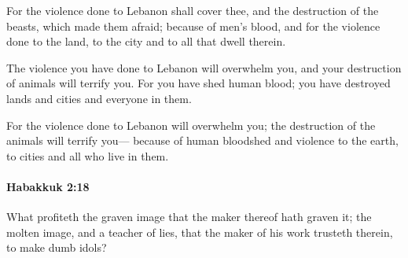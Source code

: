 			\begin{versebox}
					\item[BHS] 
					\item[LXX] 
					\item[ASV] For the violence done to Lebanon shall cover thee, and the destruction of the beasts, which made them afraid; because of men's blood, and for the violence done to the land, to the city and to all that dwell therein.
					\item[NIV] The violence you have done to Lebanon will overwhelm you, and your destruction of animals will terrify you. For you have shed human blood; you have destroyed lands and cities and everyone in them.
					\item[NRSV] For the violence done to Lebanon will overwhelm you; the destruction of the animals will terrify you— because of human bloodshed and violence to the earth, to cities and all who live in them.
			\end{versebox}

		\paragraph{Habakkuk 2:18} %
			\label{HABAKKUK-2-18}

			What profiteth the graven image that the maker thereof hath graven it; the molten image, and a teacher of lies, that the maker of his work trusteth therein, to make dumb idols?

